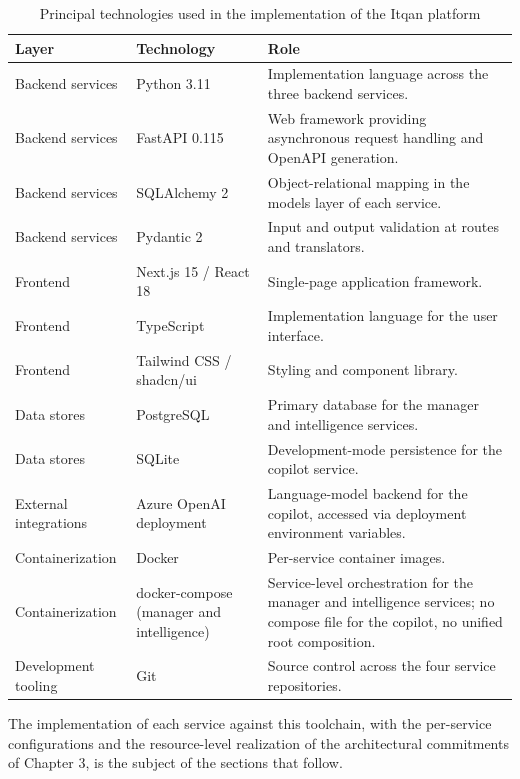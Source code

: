 \begin{table}[H]
\centering
\renewcommand{\arraystretch}{1.3}
\begin{tabular}{|p{3.4cm}|p{4.6cm}|p{6cm}|}
\hline
\rowcolor{lightgray}
\textbf{Layer} & \textbf{Technology} & \textbf{Role} \\ \hline
Backend services & Python 3.11 & Implementation language across the three backend services. \\ \hline
Backend services & FastAPI 0.115 & Web framework providing asynchronous request handling and OpenAPI generation. \\ \hline
Backend services & SQLAlchemy 2 & Object-relational mapping in the models layer of each service. \\ \hline
Backend services & Pydantic 2 & Input and output validation at routes and translators. \\ \hline
Frontend & Next.js 15 / React 18 & Single-page application framework. \\ \hline
Frontend & TypeScript & Implementation language for the user interface. \\ \hline
Frontend & Tailwind CSS / shadcn/ui & Styling and component library. \\ \hline
Data stores & PostgreSQL & Primary database for the manager and intelligence services. \\ \hline
Data stores & SQLite & Development-mode persistence for the copilot service. \\ \hline
External integrations & Azure OpenAI deployment & Language-model backend for the copilot, accessed via deployment environment variables. \\ \hline
Containerization & Docker & Per-service container images. \\ \hline
Containerization & docker-compose (manager and intelligence) & Service-level orchestration for the manager and intelligence services; no compose file for the copilot, no unified root composition. \\ \hline
Development tooling & Git & Source control across the four service repositories. \\ \hline
\end{tabular}
\caption{Principal technologies used in the implementation of the Itqan platform}
\label{tab:toolchain}
\end{table}

The implementation of each service against this toolchain, with the per-service configurations and the resource-level realization of the architectural commitments of Chapter 3, is the subject of the sections that follow.


